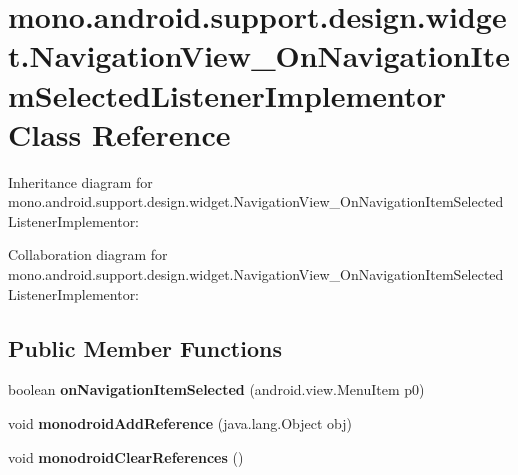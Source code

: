 \hypertarget{classmono_1_1android_1_1support_1_1design_1_1widget_1_1_navigation_view___on_navigation_item_selected_listener_implementor}{}\section{mono.\+android.\+support.\+design.\+widget.\+Navigation\+View\+\_\+\+On\+Navigation\+Item\+Selected\+Listener\+Implementor Class Reference}
\label{classmono_1_1android_1_1support_1_1design_1_1widget_1_1_navigation_view___on_navigation_item_selected_listener_implementor}


Inheritance diagram for mono.\+android.\+support.\+design.\+widget.\+Navigation\+View\+\_\+\+On\+Navigation\+Item\+Selected\+Listener\+Implementor\+:


Collaboration diagram for mono.\+android.\+support.\+design.\+widget.\+Navigation\+View\+\_\+\+On\+Navigation\+Item\+Selected\+Listener\+Implementor\+:
\subsection*{Public Member Functions}
\begin{DoxyCompactItemize}
\item 
\mbox{\label{classmono_1_1android_1_1support_1_1design_1_1widget_1_1_navigation_view___on_navigation_item_selected_listener_implementor_a7a1944dd1ff571ff377bd69245bdf594}} 
boolean {\bfseries on\+Navigation\+Item\+Selected} (android.\+view.\+Menu\+Item p0)
\item 
\mbox{\label{classmono_1_1android_1_1support_1_1design_1_1widget_1_1_navigation_view___on_navigation_item_selected_listener_implementor_a8bc0b14e6513bff83883d834a9db2471}} 
void {\bfseries monodroid\+Add\+Reference} (java.\+lang.\+Object obj)
\item 
\mbox{\label{classmono_1_1android_1_1support_1_1design_1_1widget_1_1_navigation_view___on_navigation_item_selected_listener_implementor_a5afbcfa48efc997f1eaad7b5f3018d18}} 
void {\bfseries monodroid\+Clear\+References} ()
\end{DoxyCompactItemize}
